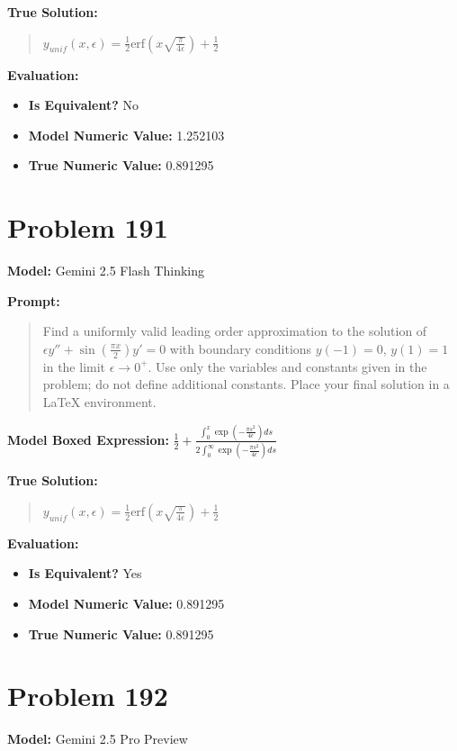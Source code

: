 \documentclass{article}
\begin{document}
{\textbf{True Solution:}
\begin{quote}
$y_{unif}(x, \epsilon) = \frac{1}{2} \text{erf}\left(x \sqrt{\frac{\pi}{4\epsilon}}\right) + \frac{1}{2}$
\end{quote}

\textbf{Evaluation:}
\begin{itemize}
\item \textbf{Is Equivalent?} No
\item \textbf{Model Numeric Value:} 1.252103
\item \textbf{True Numeric Value:} 0.891295
\end{itemize}
\vspace{1cm}
\section*{Problem 191}
\textbf{Model:} Gemini 2.5 Flash Thinking

\textbf{Prompt:}
\begin{quote}
Find a uniformly valid leading order approximation to the solution of $\epsilon y'' + \sin\left(\frac{\pi x}{2}\right) y' = 0$ with boundary conditions $y(-1) = 0$, $y(1) = 1$ in the limit $\epsilon \to 0^+$. Use only the variables and constants given in the problem; do not define additional constants. Place your final solution in a $\boxed{}$ LaTeX environment.
\end{quote}
\textbf{Model Boxed Expression:} $\frac{1}{2} + \frac{\int_0^x \exp\left(-\frac{\pi s^2}{4\epsilon}\right)ds}{2 \int_0^\infty \exp\left(-\frac{\pi s^2}{4\epsilon}\right)ds}$

\textbf{True Solution:}
\begin{quote}
$y_{unif}(x, \epsilon) = \frac{1}{2} \text{erf}\left(x \sqrt{\frac{\pi}{4\epsilon}}\right) + \frac{1}{2}$
\end{quote}

\textbf{Evaluation:}
\begin{itemize}
\item \textbf{Is Equivalent?} Yes
\item \textbf{Model Numeric Value:} 0.891295
\item \textbf{True Numeric Value:} 0.891295
\end{itemize}
\vspace{1cm}
\section*{Problem 192}
\textbf{Model:} Gemini 2.5 Pro Preview

}
\end{document}
